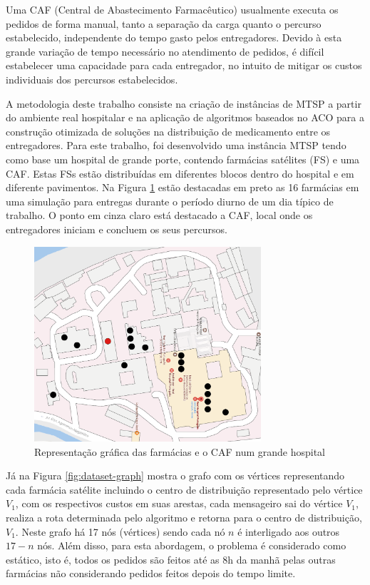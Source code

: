 Uma CAF (Central de Abastecimento Farmacêutico) usualmente executa os pedidos de forma manual, tanto a separação da carga quanto o percurso estabelecido, independente do tempo gasto pelos entregadores. Devido à esta grande variação de tempo necessário no atendimento de pedidos, é difícil estabelecer uma capacidade para cada entregador, no intuito de mitigar os custos individuais dos percursos estabelecidos.

A metodologia deste trabalho consiste na criação de instâncias de MTSP a partir do ambiente real hospitalar e na aplicação de algoritmos baseados no ACO para a construção otimizada de soluções na distribuição de medicamento entre os entregadores.
Para este trabalho, foi desenvolvido uma instância MTSP tendo como base um hospital de grande porte, contendo farmácias satélites (FS) e uma CAF. Estas FSs estão distribuídas em diferentes blocos dentro do hospital e em diferente pavimentos. Na Figura \ref{fig:dataset-map} estão destacadas em preto as 16 farmácias em uma simulação para entregas durante o período diurno de um dia típico de trabalho. O ponto em cinza claro está destacado a CAF, local onde os entregadores iniciam e concluem os seus percursos.

\begin{figure}[htb]
    \centering
    \caption{\label{fig:dataset-map}Representação gráfica das farmácias e o CAF num grande hospital} 
    \includegraphics[width=0.75\textwidth]{imagens/dataset-map.png}
\end{figure}

Já na Figura \ref{fig:dataset-graph} mostra o grafo com os vértices representando cada farmácia satélite incluindo o centro de distribuição representado pelo vértice $V_1$, com os respectivos custos em suas arestas, cada mensageiro sai do vértice $V_1$, realiza a rota determinada pelo algoritmo e retorna para o centro de distribuição, $V_1$. Neste grafo há 17 nós (vértices) sendo cada nó $n$ é interligado aos outros $17 - n$ nós. Além disso, para esta abordagem, o problema é considerado como estático, isto é, todos os pedidos são feitos até as 8h da manhã pelas outras farmácias não considerando pedidos feitos depois do tempo limite.

